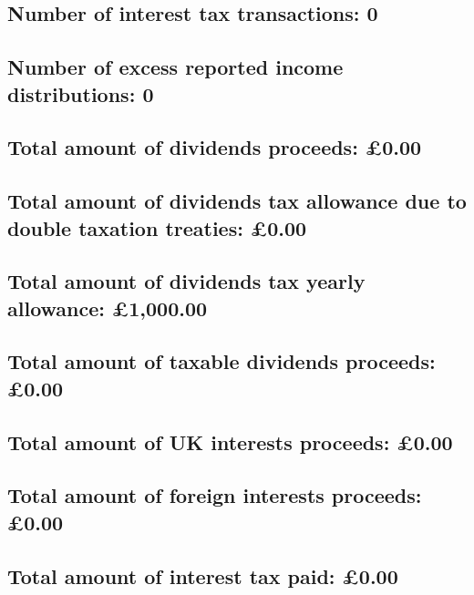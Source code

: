 \documentclass{article}
\begin{document}
\subsection*{Number of interest tax transactions: 0}
\subsection*{Number of excess reported income distributions: 0}
\subsection*{Total amount of dividends proceeds: £0.00}
\subsection*{Total amount of dividends tax allowance due to double taxation treaties: £0.00}
\subsection*{Total amount of dividends tax yearly allowance: £1,000.00}
\subsection*{Total amount of taxable dividends proceeds: £0.00}
\subsection*{Total amount of UK interests proceeds: £0.00}
\subsection*{Total amount of foreign interests proceeds: £0.00}
\subsection*{Total amount of interest tax paid: £0.00}
\end{document}
